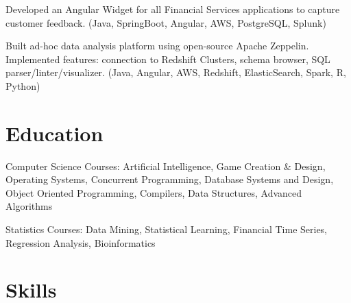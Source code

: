 \documentclass[a4paper]{deedy-resume-openfont} %
\begin{document}
\sectionsep %


\begin{tightemize}
\item Developed an Angular Widget for all Financial Services applications to capture customer feedback. (Java, SpringBoot, Angular, AWS, PostgreSQL, Splunk)
\item Built ad-hoc data analysis platform using open-source Apache Zeppelin. Implemented features: connection to Redshift Clusters, schema browser, SQL parser/linter/visualizer. (Java, Angular, AWS, Redshift, ElasticSearch, Spark, R, Python)
\end{tightemize}

\sectionsep %

\sectionsep
\sectionsep
\section{Education}
\sectionheadersep


\begin{tightemize}
\item Computer Science Courses: Artificial Intelligence, Game Creation \& Design, Operating Systems, Concurrent Programming, Database Systems and Design, Object Oriented Programming, Compilers, Data Structures, Advanced Algorithms
\item Statistics Courses: Data Mining, Statistical Learning, Financial Time Series, Regression Analysis, Bioinformatics
\end{tightemize}

\sectionsep %
\sectionsep %


\section{Skills}
\sectionheadersep
\end{document}
